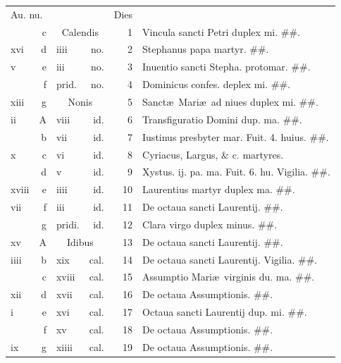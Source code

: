 \documentclass[a5paper,10pt]{book}
\def\ae{æ}
\begin{document}
\begin{center}
\begin{tabular}{l r l r r l}
\multicolumn{2}{l}{\color{red}Au. nu.} & & & \color{red} Dies & \\
 & c & \multicolumn{2}{c}{\color{red} Calendis} & 1 & \color{red} Vincula sancti Petri duplex mi. \color{black} \#\#.\\
xvi & d & iiii & no. & 2 & Stephanus papa martyr. \color{black} \#\#.\\
v & e & iii & no. & 3 & \color{red} Inuentio sancti Stepha. protomar. \color{black} \#\#.\\
 & f & \color{red} prid. & no. & 4 & Dominicus confes. deplex mi. \color{black} \#\#.\\
xiii & g & \multicolumn{2}{c}{\color{red} Nonis} & 5 & Sanct\ae \ Mari\ae \ ad niues duplex mi. \color{black} \#\#.\\
ii & \color{red} A & viii & id. & 6 & \color{red} Transfiguratio Domini dup. ma. \color{black} \#\#.\\
 & b & vii & id. & 7 & Iustinus presbyter mar. \color{red} Fuit. 4. huius. \color{black} \#\#.\\
x & c & vi & id. & 8 & Cyriacus, Largus, \& c. martyres. \\
 & d & v & id. & 9 & Xystus. ij. pa. ma. \color{red} Fuit. 6. hu. Vigilia. \color{black} \#\#.\\
xviii & e & iiii & id. & 10 & \color{red} Laurentius martyr duplex ma. \color{black} \#\#.\\
vii & f & iii & id. & 11 & De octaua sancti Laurentij. \color{black} \#\#.\\
 & g & \color{red} pridi. & id. & 12 & Clara virgo duplex minus. \color{black} \#\#.\\
xv & \color{red} A & \multicolumn{2}{c}{\color{red} Idibus} & 13 & De octaua sancti Laurentij. \#\#.\\
iiii & b & xix & cal. & 14 & De octaua sancti Laurentij. \color{red} Vigilia. \color{black} \#\#.\\%
 & c & xviii & cal. & 15 & \color{red} Assumptio Mari\ae \ virginis du. ma. \color{black} \#\#.\\
xii & d & xvii & cal. & 16 & De octaua Assumptionis. \#\#.\\
i & e & xvi & cal. & 17 & Octaua sancti Laurentij dup. mi. \#\#.\\
 & f & xv & cal. & 18 & De octaua Assumptionis. \#\#.\\
ix & g & xiiii & cal. & 19 & De octaua Assumptionis. \color{black} \#\#.\\

\end{tabular}
\end{center}
\end{document}
